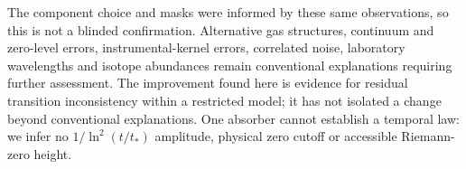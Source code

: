 The component choice and masks were informed by these same observations, so this is not a blinded confirmation. Alternative gas structures, continuum and zero-level errors, instrumental-kernel errors, correlated noise, laboratory wavelengths and isotope abundances remain conventional explanations requiring further assessment. The improvement found here is evidence for residual transition inconsistency within a restricted model; it has not isolated a change beyond conventional explanations. One absorber cannot establish a temporal law: we infer no $1/\ln^2(t/t_*)$ amplitude, physical zero cutoff or accessible Riemann-zero height.
